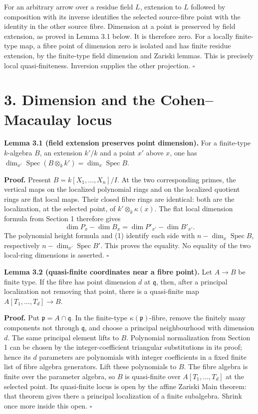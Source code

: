 \documentclass[11pt,a4paper,openany]{report}
\begin{document}
For an arbitrary arrow over a residue field \(L\), extension to \(L\) followed by composition with its inverse identifies the selected source-fibre point with the identity in the other source fibre. Dimension at a point is preserved by field extension, as proved in Lemma 3.1 below. It is therefore zero. For a locally finite-type map, a fibre point of dimension zero is isolated and has finite residue extension, by the finite-type field dimension and Zariski lemmas. This is precisely local quasi-finiteness. Inversion supplies the other projection. \(\square\)

\section{3. Dimension and the Cohen--Macaulay locus}\label{AG-RG-S07-dimension-and-the-cohenmacaulay-locus}

\textbf{Lemma 3.1 (field extension preserves point dimension).} For a finite-type \(k\)-algebra \(B\), an extension \(k'/k\) and a point \(x'\) above \(x\), one has \(\dim_{x'}\operatorname{Spec}(B\otimes_k k')=\dim_x\operatorname{Spec}B\).

\textbf{Proof.} Present \(B=k[X_1,\ldots,X_n]/I\). At the two corresponding primes, the vertical maps on the localized polynomial rings and on the localized quotient rings are flat local maps. Their closed fibre rings are identical: both are the localization, at the selected point, of \(k'\otimes_k\kappa(x)\). The flat local dimension formula from Section 1 therefore gives \[
  \dim P_{x}-\dim B_x
   =\dim P'_{x'}-\dim B'_{x'}.
  \] The polynomial height formula and (1) identify each side with \(n-\dim_x\operatorname{Spec}B\), respectively \(n-\dim_{x'}\operatorname{Spec}B'\). This proves the equality. No equality of the two local-ring dimensions is asserted. \(\square\)

\textbf{Lemma 3.2 (quasi-finite coordinates near a fibre point).} Let \(A\to B\) be finite type. If the fibre has point dimension \(d\) at \(\mathfrak q\), then, after a principal localization not removing that point, there is a quasi-finite map \(A[T_1,\ldots,T_d]\to B\).

\textbf{Proof.} Put \(\mathfrak p=A\cap\mathfrak q\). In the finite-type \(\kappa(\mathfrak p)\)-fibre, remove the finitely many components not through \(\mathfrak q\), and choose a principal neighbourhood with dimension \(d\). The same principal element lifts to \(B\). Polynomial normalization from Section 1 can be chosen by the integer-coefficient triangular substitutions in its proof; hence its \(d\) parameters are polynomials with integer coefficients in a fixed finite list of fibre algebra generators. Lift these polynomials to \(B\). The fibre algebra is finite over the parameter algebra, so \(B\) is quasi-finite over \(A[T_1,\ldots,T_d]\) at the selected point. Its quasi-finite locus is open by the affine Zariski Main theorem: that theorem gives there a principal localization of a finite subalgebra. Shrink once more inside this open. \(\square\)
\end{document}
